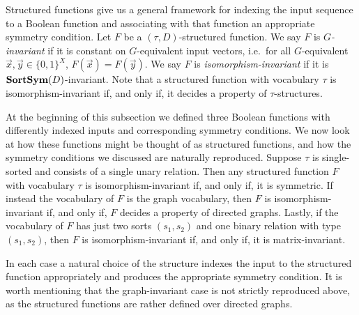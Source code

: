 \documentclass[../paper.tex]{subfiles}
\begin{document}

Structured functions give us a general framework for indexing the input sequence
to a Boolean function and associating with that function an appropriate symmetry
condition. Let $F$ be a $(\tau, D)$-structured function. We say $F$ is
\emph{$G$-invariant} if it is constant on $G$-equivalent input vectors, i.e.\
for all $G$-equivalent $\vec{x}, \vec{y} \in \{0,1\}^{X}$, $F(\vec{x}) =
F(\vec{y})$. We say $F$ is \emph{isomorphism-invariant} if it is $\text{\textbf{SortSym}}
(D)$-invariant. Note that a structured function with vocabulary $\tau$ is
isomorphism-invariant if, and only if, it decides a property of
$\tau$-structures.

At the beginning of this subsection we defined three Boolean functions with
differently indexed inputs and corresponding symmetry conditions. We now look at
how these functions might be thought of as structured functions, and how the
symmetry conditions we discussed are naturally reproduced. Suppose $\tau$ is
single-sorted and consists of a single unary relation. Then any structured
function $F$ with vocabulary $\tau$ is isomorphism-invariant if, and only if, it
is symmetric. If instead the vocabulary of $F$ is the graph vocabulary, then $F$
is isomorphism-invariant if, and only if, $F$ decides a property of directed
graphs. Lastly, if the vocabulary of $F$ has just two sorts $(s_1, s_2)$ and one
binary relation with type $(s_1, s_2)$, then $F$ is isomorphism-invariant if,
and only if, it is matrix-invariant.

In each case a natural choice of the structure indexes the input to the
structured function appropriately and produces the appropriate symmetry
condition. It is worth mentioning that the graph-invariant case is not strictly
reproduced above, as the structured functions are rather defined over directed
graphs.
\end{document}
